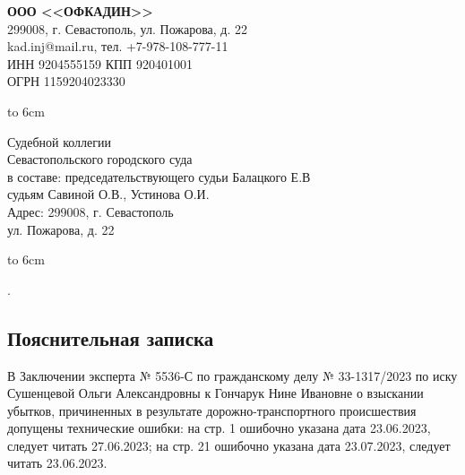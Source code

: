 \setcounter{page}{1}
\pagestyle{empty} %


\noindent\parbox[l][71mm]{80mm}
{
	\begin{center}
		{\small \textbf{ООО <<ОФКАДИН>>\\
		}}
		\small{299008, г. Севастополь, ул. Пожарова, д. 22\\
		kad.inj@mail.ru, тел. +7-978-108-777-11}\\
		{ИНН 9204555159 КПП 920401001\\ ОГРН 1159204023330}
	\end{center}
	\hbox to 6cm{ }}\hfill
\parbox[l][71mm]{65mm}
{ \begin{center}
		\small{
			{Судебной коллегии\\ Севастопольского городского суда\\ в составе: председательствующего судьи	 Балацкого Е.В\\судьям	 Савиной О.В., Устинова О.И.}\\
		\small{Адрес: 299008, г. Севастополь\\ ул. Пожарова, д. 22}
			\vspace{1mm}
			}
	\end{center}
	\hbox to 6cm{ }}
\linebreak
\vspace{-22mm}
.

\begin{center}
	\section{{\Large \textbf{Пояснительная записка}}}
\end{center}

В Заключении эксперта № 5536-С по гражданскому делу № 33-1317/2023 по иску Сушенцевой Ольги Александровны к Гончарук Нине Ивановне о взыскании убытков, причиненных в результате дорожно-транспортного происшествия допущены технические ошибки: на стр. 1   ошибочно указана дата  23.06.2023, следует читать  27.06.2023; на стр. 21  ошибочно указана дата  23.07.2023, следует читать 23.06.2023.

